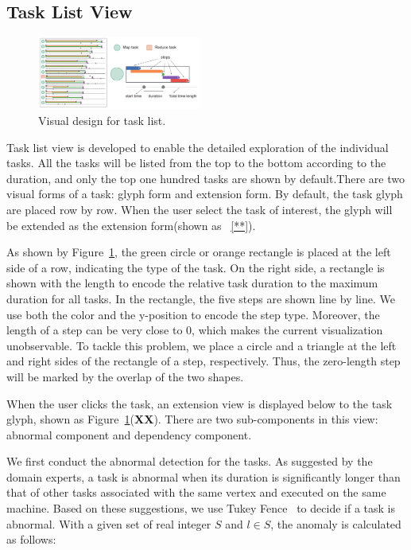 \subsection{Task List View}


\begin{figure}[t]
	\centering
	\includegraphics[width=0.48\textwidth]{figures/visualization/taskList.pdf}
	\vspace{-3mm}
	\caption{Visual design for task list.}
	\label{fig:taskList}
	\vspace{-3mm}
\end{figure}

Task list view is developed to enable the detailed exploration of the individual tasks.
All the tasks will be listed from the top to the bottom according to the duration, and only the top one hundred tasks are shown by default.There are two visual forms of a task: glyph form and extension form. By default, the task glyph are placed row by row. When the user select the task of interest, the glyph will be extended as the extension form(shown as ~\ref{**}).

As shown by Figure~\ref{fig:taskList}, the green circle or orange rectangle is placed at the left side of a row, indicating the type of the task. On the right side, a rectangle is shown with the length to encode the relative task duration to the maximum duration for all tasks. In the rectangle, the five steps are shown line by line. We use both the color and the y-position to encode the step type. Moreover, the length of a step can be very close to 0, which makes the current visualization unobservable. To tackle this problem, we place a circle and a triangle at the left and right sides of the rectangle of a step, respectively. Thus, the zero-length step will be marked by the overlap of the two shapes.

 When the user clicks the task, an extension view is displayed below to the task glyph, shown as Figure~\ref{fig:taskList}(\textbf{XX}). There are two sub-components in this view: abnormal component and dependency component. 


We first conduct the abnormal detection for the tasks. As suggested by the domain experts, a task is abnormal when its duration is significantly longer than that of other tasks associated with the same vertex and executed on the same machine. Based on these suggestions, we use Tukey Fence~\cite{tukey1977exploratory} to decide if a task is abnormal. With a given set of real integer $S$ and $l \in S$, the 
anomaly is calculated as follows:

